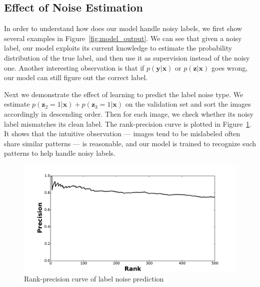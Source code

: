 \documentclass[10pt,twocolumn,letterpaper]{article}
\def\vec{\mathbf}
\begin{document}
\subsection{Effect of Noise Estimation} %
\label{sub:effect_of_noise_estimation}
In order to understand how does our model handle noisy labels, we first show several examples in Figure~\ref{fig:model_output}. We can see that given a noisy label, our model exploits its current knowledge to estimate the probability distribution of the true label, and then use it as supervision instead of the noisy one. Another interesting observation is that if $p(\vec{y}|\vec{x})$ or $p(\vec{z}|\vec{x})$ goes wrong, our model can still figure out the correct label.

Next we demonstrate the effect of learning to predict the label noise type. We estimate $p(\vec{z}_2=1|\vec{x})+p(\vec{z}_3=1|\vec{x})$ on the validation set and sort the images accordingly in descending order. Then for each image, we check whether its noisy label mismatches its clean label. The rank-precision curve is plotted in Figure~\ref{fig:noise_prediction_rp}. It shows that the intuitive observation --- images tend to be mislabeled often share similar patterns --- is reasonable, and our model is trained to recognize such patterns to help handle noisy labels.

\begin{figure}[t]
\begin{center}
\includegraphics[width=1.0\linewidth]{figure/noise_prediction_rank_precision.pdf}
\end{center}
\caption{Rank-precision curve of label noise prediction}
\label{fig:noise_prediction_rp}
\end{figure}
\end{document}
